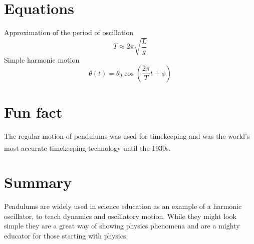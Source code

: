 \documentclass{article}
\begin{document}
\section{Equations}
Approximation of the period of oscillation
\begin{equation}
    T \approx 2\pi\sqrt{\frac{L}{g}}
\label{equ:first}
\end{equation}
Simple harmonic motion
\begin{equation}
\theta(t)=\theta_0\cos(\frac{2\pi}{T}t+\phi)
\end{equation}


\newpage
\section{Fun fact}
The regular motion of pendulums was used for timekeeping and was the world's most accurate timekeeping technology until the 1930s.\textsuperscript{\cite{2ndbook}}


\newpage

\section{Summary}
Pendulums are widely used in science education as an example of a harmonic oscillator, to teach dynamics and oscillatory motion. While they might look simple  they are a great way of showing physics phenomena and are a mighty educator for those starting with physics.
\vspace*{\fill}

\end{document}

